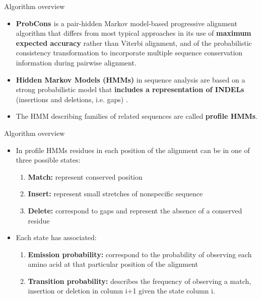 \begin{frame}{Algorithm overview}
    \begin{itemize}
        \item \textbf{ProbCons \cite{do2005probcons}} is a pair-hidden Markov model-based progressive alignment algorithm that differs from most typical approaches in its use of \textbf{maximum expected accuracy} rather than Viterbi alignment, and of the probabilistic consistency transformation to incorporate multiple sequence conservation information during pairwise alignment. 
        \item \textbf{Hidden Markov Models (HMMs)} in sequence analysis are based on a strong probabilistic model that \textbf{includes a representation of INDELs} (insertions and deletions, i.e. gaps) \cite{durbin1998biological}. 
        \item The HMM describing families of related sequences are called \textbf{profile HMMs}.
    \end{itemize}
\end{frame}

\begin{frame}{Algorithm overview}
    \begin{itemize}
        \item In profile HMMs \cite{durbin1998biological} residues in each position of the alignment can be in one of three possible states:
        \begin{enumerate}
            \item \textbf{Match:} represent conserved position
            \item \textbf{Insert:} represent small stretches of nonspecific sequence
            \item \textbf{Delete:} correspond to gaps and represent the absence of a conserved residue
        \end{enumerate}
        \item Each state has associated:
        \begin{enumerate}
            \item \textbf{Emission probability:} correspond to the probability of observing each amino acid at that particular position of the alignment
            \item \textbf{Transition probability:} describes the frequency of observing a match, insertion or deletion in column i+1 given the state column i. 
        \end{enumerate}
    \end{itemize}
    
\end{frame}

